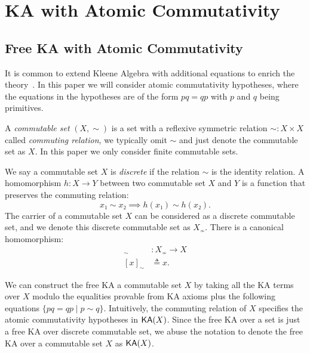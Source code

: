 \chapter{KA with Atomic Commutativity}
\label{chapter:commutativity}
\thispagestyle{myheadings}

\graphicspath{{2_Commutativity/Figures/}}

\section{Free KA with Atomic Commutativity}

It is common to extend Kleene Algebra with additional equations 
to enrich the theory~\cite{Doumane_Kuperberg_Pous_Pradic_2019, Kozen_Mamouras_2014, Pous_Rot_Wagemaker_2021}.
In this paper we will consider atomic commutativity hypotheses,
where the equations in the hypotheses are of the form \(p q = q p\)
with \(p\) and \(q\) being primitives.

A \emph{commutable set} \((X, ∼)\) is a set with a reflexive symmetric relation \(∼: X × X\)
called \emph{commuting relation},
we typically omit \(∼\) and just denote the commutable set as \(X\).
In this paper we only consider finite commutable sets.

We say a commutable set \(X\) is \emph{discrete} if the relation \(∼\) is the identity relation.
A homomorphism \(h: X → Y\) between two commutable set \(X\) and \(Y\)
is a function that preserves the commuting relation:
\[x₁ ∼ x₂ ⟹ h(x₁) ∼ h(x₂).\]
The carrier of a commutable set \(X\) can be considered as a discrete commutable set,
and we denote this discrete commutable set as \(X_≁\).
There is a canonical homomorphism:
\begin{align*}
  [-]_∼ & : X_≁ → X \\  
  [x]_∼ & ≜ x.
\end{align*}

We can construct the free KA a commutable set \(X\) by 
taking all the KA terms over \(X\) modulo the equalities provable from KA axioms plus
the following equations \(\{p q = q p ∣ p ∼ q\}\).
Intuitively, the commuting relation of \(X\) specifies 
the atomic commutativity hypotheses in \(\mathsf{KA}(X)\).
Since the free KA over a set is just a free KA over discrete commutable set,
we abuse the notation to denote the free KA over a commutable set \(X\) as \(\mathsf{KA}(X)\).

